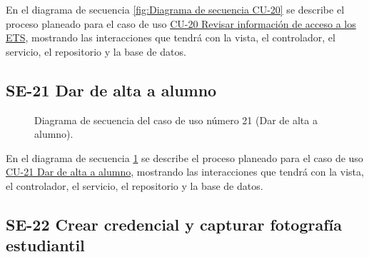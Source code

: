 En el diagrama de secuencia \ref{fig:Diagrama de secuencia CU-20} se describe el proceso planeado para el caso de uso \hyperlink{CU-20}{CU-20 Revisar información de acceso a los ETS}, mostrando las interacciones que tendrá con la vista, el controlador, el servicio, el repositorio y la base de datos.

\newpage

\subsection{SE-21 Dar de alta a alumno}

\begin{figure}[htbp!]
	\begin{center}
		\caption{Diagrama de secuencia del caso de uso número 21 (Dar de alta a alumno).}
		\label{fig:Diagrama de secuencia CU-21}
	\end{center}
\end{figure}

En el diagrama de secuencia \ref{fig:Diagrama de secuencia CU-21} se describe el proceso planeado para el caso de uso \hyperlink{CU-21}{CU-21 Dar de alta a alumno}, mostrando las interacciones que tendrá con la vista, el controlador, el servicio, el repositorio y la base de datos.

\newpage

\subsection{SE-22 Crear credencial y capturar fotografía estudiantil}

